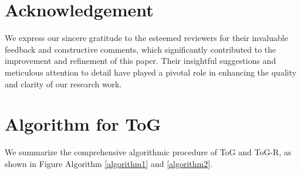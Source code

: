 \documentclass{article} %
\begin{document}
\section{Acknowledgement}
We express our sincere gratitude to the esteemed reviewers for their invaluable feedback and constructive comments, which significantly contributed to the improvement and refinement of this paper. Their insightful suggestions and meticulous attention to detail have played a pivotal role in enhancing the quality and clarity of our research work.





\newpage

\appendix

\section{Algorithm for ToG}
We summarize the comprehensive algorithmic procedure of ToG and ToG-R, as shown in Figure Algorithm \ref{algorithm1} and \ref{algorithm2}.
\end{document}
